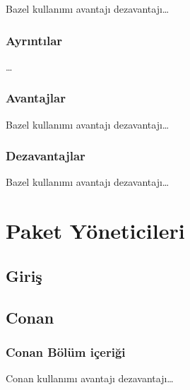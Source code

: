 \documentclass[
]{book}
\begin{document}
Bazel kullanımı avantajı dezavantajı\ldots{}

\hypertarget{ayrux131ntux131lar-9}{%
\section*{Ayrıntılar}\label{ayrux131ntux131lar-9}}

\ldots{}

\hypertarget{avantajlar-9}{%
\section*{Avantajlar}\label{avantajlar-9}}

Bazel kullanımı avantajı dezavantajı\ldots{}

\hypertarget{dezavantajlar-9}{%
\section*{Dezavantajlar}\label{dezavantajlar-9}}

Bazel kullanımı avantajı dezavantajı\ldots{}

\hypertarget{part-paket-yuxf6neticileri}{%
\part{Paket Yöneticileri}\label{part-paket-yuxf6neticileri}}

\hypertarget{giriux15f-2}{%
\chapter*{Giriş}\label{giriux15f-2}}

\hypertarget{conan}{%
\chapter*{Conan}\label{conan}}

\hypertarget{conan-buxf6luxfcm-iuxe7eriux11fi}{%
\section*{Conan Bölüm içeriği}\label{conan-buxf6luxfcm-iuxe7eriux11fi}}

Conan kullanımı avantajı dezavantajı\ldots{}
\end{document}
